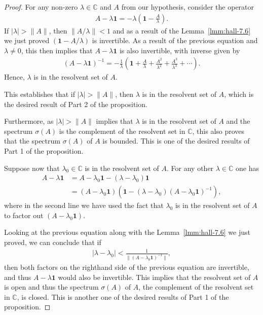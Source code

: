 \begin{proof}
    \leanok
For any non-zero $\lambda \in \mathbb{C}$ and $A$ from our hypothesis, consider the operator
\begin{align}
    A - \lambda \mathbf{1} = -\lambda \left( \mathbf{1} - \frac{A}{\lambda} \right).
\end{align}
If $\lvert \lambda \rvert > \|A\|$, then $\|A / \lambda\| < 1$ and as a result of the Lemma~\ref{lmm:hall-7.6} we just proved $(\mathbf{1} - A / \lambda)$ is invertible. As a result of the previous equation and $\lambda \neq 0$, this then implies that $A - \lambda \mathbf{1}$ is also invertible, with inverse given by
\begin{align}
    (A - \lambda \mathbf{1})^{-1} = - \frac{1}{\lambda} \left( \mathbf{1} + \frac{A}{\lambda} + \frac{A^2}{\lambda^2} + \frac{A^3}{\lambda^3} + \cdots \right).
\end{align}
Hence, $\lambda$ is in the resolvent set of $A$.

This establishes that if $\lvert \lambda \rvert > \|A\|$, then $\lambda$ is in the resolvent set of $A$, which is the desired result of Part 2 of the proposition.

Furthermore, as $\lvert \lambda \rvert > \|A\|$ implies that $\lambda$ is in the resolvent set of $A$ and the spectrum $\sigma(A)$ is the complement of the resolvent set in $\mathbb{C}$, this also proves that the spectrum $\sigma(A)$ of $A$ is bounded. This is one of the desired results of Part 1 of the proposition.

Suppose now that $\lambda_0 \in \mathbb{C}$ is in the resolvent set of $A$. For any other $\lambda \in \mathbb{C}$ one has
\begin{align}
    A - \lambda \mathbf{1} &= A - \lambda_0 \mathbf{1} - (\lambda - \lambda_0) \mathbf{1} \\
                           &= (A - \lambda_0 \mathbf{1}) (\mathbf{1} - (\lambda - \lambda_0) (A - \lambda_0 \mathbf{1})^{-1} ),
\end{align}
where in the second line we have used the fact that $\lambda_0$ is in the resolvent set of $A$ to factor out $(A - \lambda_0 \mathbf{1})$.

Looking at the previous equation along with the Lemma~\ref{lmm:hall-7.6} we just proved, we can conclude that if
\begin{align}
    \lvert \lambda - \lambda_0 \rvert < \frac{1}{\|(A - \lambda_0 \mathbf{1})^{-1}\|},
\end{align}
then both factors on the righthand side of the previous equation are invertible, and thus $A - \lambda \mathbf{1}$ would also be invertible. This implies that the resolvent set of $A$ is open and thus the spectrum $\sigma(A)$ of $A$, the complement of the resolvent set in $\mathbb{C}$, is closed. This is another one of the desired results of Part 1 of the proposition.


\end{proof}
